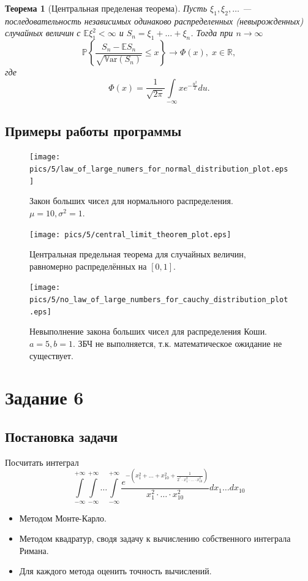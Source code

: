 \documentclass[11pt]{article}
\newtheorem{theorem}{Теорема}
\begin{document}
\begin{theorem}[Центральная пределеная теорема]
Пусть $\xi_1, \xi_2, \ldots$ --- последовательность независимых одинаково распределенных (невырожденных) случайных величин с $\mathbb{E}\xi_1^2 < \infty$ и $S_n = \xi_1 + \ldots + \xi_n$. Тогда при $n \rightarrow \infty$
$$
\mathbb{P}\left\{ \frac{S_n - \mathbb{E}S_n}{\sqrt{\mathbb{V}\mathrm{ar} \left( S_n \right)}} \leqslant x \right\} \rightarrow \Phi(x), \; x \in \mathbb{R},
$$
где
$$
\Phi(x) = \frac{1}{\sqrt{2\pi}} \int\limits_{-\infty}{x} e^{-\frac{u^2}{2}} du.
$$
\end{theorem}
\subsection{Примеры работы программы}
\begin{figure}[h!]
	\centering
	\texttt{[image: pics/5/law\_of\_large\_numers\_for\_normal\_distribution\_plot.eps]}
	\caption{Закон больших чисел для нормального распределения. $\mu = 10, \sigma^2 = 1$.}
\end{figure}
\begin{figure}[h!]
	\centering
	\texttt{[image: pics/5/central\_limit\_theorem\_plot.eps]}
	\caption{Центральная предельная теорема для случайных величин, равномерно распределённых на $[0, 1]$.}
\end{figure}
\begin{figure}[h!]
	\centering
	\texttt{[image: pics/5/no\_law\_of\_large\_numbers\_for\_cauchy\_distribution\_plot.eps]}
	\caption{Невыполнение закона больших чисел для распределения Коши. $a =	5, b = 1$. ЗБЧ не выполняется, т.к. математическое ожидание не существует.}
\end{figure}
\pagebreak
\section{Задание 6}
\subsection{Постановка задачи}
Посчитать интеграл
$$
\int\limits_{-\infty}^{+\infty} \int\limits_{-\infty}^{+\infty} \ldots \int\limits_{-\infty}^{+\infty} \frac{e^{-\left( x_1^2 + \ldots + x_{10}^2 + \frac{1}{2^7 \cdot x_1^2 \cdot \ldots \cdot x_{10}^2} \right) }}{x_1^2 \cdot \ldots \cdot x_{10}^2} dx_1 \ldots dx_{10}
$$
\begin{itemize}
\item Методом Монте-Карло.
\item Методом квадратур, сводя задачу к вычислению собственного интеграла Римана.
\item Для каждого метода оценить точность вычислений.
\end{itemize}
\end{document}
